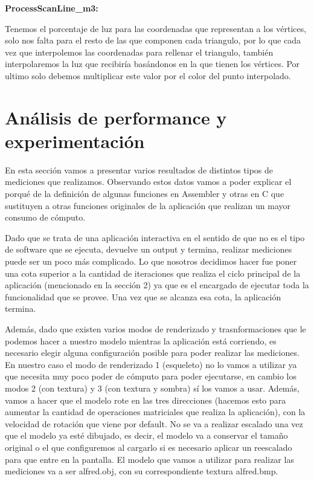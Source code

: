 \documentclass[a4paper]{article}
\newcounter{col}
\begin{document}
\textbf{ ProcessScanLine\_m3:}

Tenemos el porcentaje de luz para las coordenadas que representan a los vértices, solo nos falta para el resto de las que componen cada triangulo,  por lo que cada vez que interpolemos las coordenadas para rellenar el triangulo, también interpolaremos la luz que recibiría  basándonos en la que tienen los vértices. Por ultimo solo debemos multiplicar este valor por el color del punto interpolado.

\section{Análisis de performance y experimentación}
En esta sección vamos a presentar varios resultados de distintos tipos de mediciones que realizamos. Observando estos datos vamos a poder explicar el porqué de la definición de algunas funciones en Assembler y otras en C que sustituyen a otras funciones originales de la aplicación que realizan un mayor consumo de cómputo.

Dado que se trata de una aplicación interactiva en el sentido de que no es el tipo de software que se ejecuta, devuelve un output y termina, realizar mediciones puede ser un poco más complicado. Lo que nosotros decidimos hacer fue poner una cota superior a la cantidad de iteraciones que realiza el ciclo principal de la aplicación (mencionado en la sección 2) ya que es el encargado de ejecutar toda la funcionalidad que se provee. Una vez que se alcanza esa cota, la aplicación termina.

Además, dado que existen varios modos de renderizado y trasnformaciones que le podemos hacer a nuestro modelo mientras la aplicación está corriendo, es necesario elegir alguna configuración posible para poder realizar las mediciones. En nuestro caso el modo de renderizado 1 (esqueleto) no lo vamos a utilizar ya que necesita muy poco poder de cómputo para poder ejecutarse, en cambio los modos 2 (con textura) y 3 (con textura y sombra) sí los vamos a usar. Además, vamos a hacer que el modelo rote en las tres direcciones (hacemos esto para aumentar la cantidad de operaciones matriciales que realiza la aplicación), con la velocidad de rotación que viene por default. No se va a realizar escalado una vez que el modelo ya esté dibujado, es decir, el modelo va a conservar el tamaño original o el que configuremos al cargarlo si es necesario aplicar un reescalado para que entre en la pantalla. El modelo que vamos a utilizar para realizar las mediciones va a ser alfred.obj, con su correspondiente textura alfred.bmp.
\end{document}
